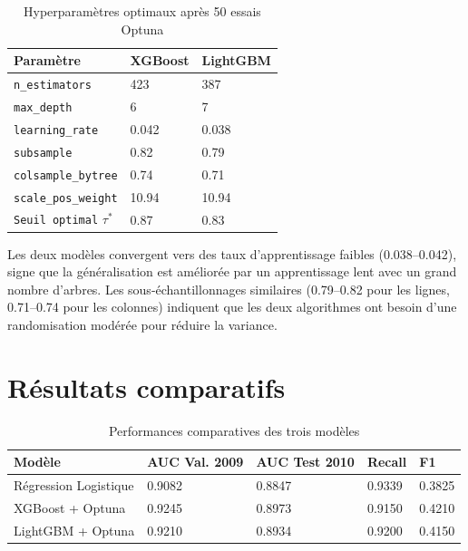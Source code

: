 \begin{table}[htbp]
\centering
\caption{Hyperparamètres optimaux après 50 essais Optuna}
\label{tab:hyperparams}
\begin{tabular}{@{}lll@{}}
\toprule
\textbf{Paramètre} & \textbf{XGBoost} & \textbf{LightGBM} \\
\midrule
\texttt{n\_estimators}      & 423   & 387 \\
\texttt{max\_depth}         &   6   &   7 \\
\texttt{learning\_rate}     & 0.042 & 0.038 \\
\texttt{subsample}          & 0.82  & 0.79 \\
\texttt{colsample\_bytree}  & 0.74  & 0.71 \\
\texttt{scale\_pos\_weight} & 10.94 & 10.94 \\
\texttt{Seuil optimal} $\tau^*$ & 0.87 & 0.83 \\
\bottomrule
\end{tabular}
\end{table}

Les deux modèles convergent vers des taux d'apprentissage faibles (0.038--0.042),
signe que la généralisation est améliorée par un apprentissage lent avec un grand
nombre d'arbres. Les sous-échantillonnages similaires (0.79--0.82 pour les lignes,
0.71--0.74 pour les colonnes) indiquent que les deux algorithmes ont besoin d'une
randomisation modérée pour réduire la variance.


\section{Résultats comparatifs}

\begin{table}[htbp]
\centering
\caption{Performances comparatives des trois modèles}
\label{tab:resultats}
\begin{tabular}{@{}lllll@{}}
\toprule
\textbf{Modèle} & \textbf{AUC Val. 2009} & \textbf{AUC Test 2010}
               & \textbf{Recall} & \textbf{F1} \\
\midrule
Régression Logistique & 0.9082 & 0.8847 & 0.9339 & 0.3825 \\
XGBoost + Optuna      & 0.9245 & 0.8973 & 0.9150 & 0.4210 \\
LightGBM + Optuna     & 0.9210 & 0.8934 & 0.9200 & 0.4150 \\
\bottomrule
\end{tabular}
\end{table}

